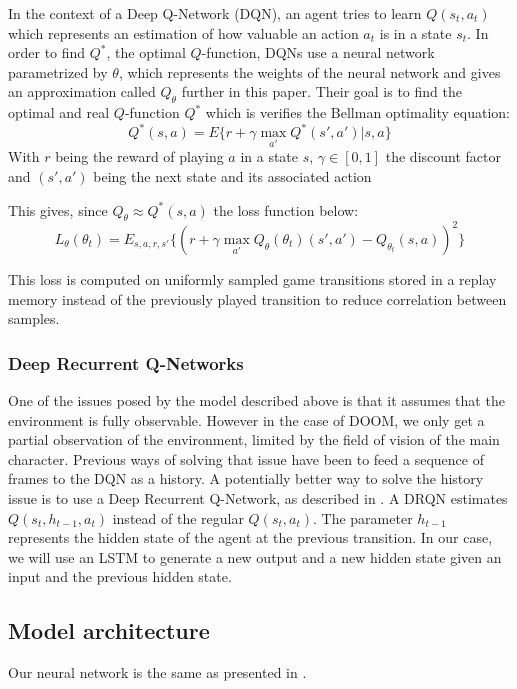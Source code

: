 \documentclass[letterpaper]{article}
\begin{document}
In the context of a Deep Q-Network (DQN), an agent tries to learn 
$Q(s_t,a_t)$ which represents an
estimation of how valuable an action $a_t$ is in a state $s_t$. In order to
find $Q^*$, the optimal $Q$-function, DQNs use a neural network
parametrized by $\theta$, which represents the weights of the neural network
and gives an approximation called $Q_\theta$ further in this paper. Their goal
is to find the optimal and real $Q$-function $Q^*$ which is verifies the Bellman
optimality equation:
$$ Q^*(s,a) = E\{r + \gamma \max_{a'}Q^*(s',a')|s,a\} $$
With $r$ being the reward of playing $a$ in a state $s$, $\gamma\in [0,1]$ the
discount factor and $(s',a')$ being the next state and its associated action

This gives, since $Q_{\theta} \approx Q^*(s,a)$ the loss function below:
$$ L_\theta(\theta_t) = E_{s,a,r,s'}\{(r +\gamma \max_{a'}Q_\theta(\theta_t)(s' , a' )-Q_{\theta_t}(s,a))^2\}$$

This loss is computed on uniformly sampled game transitions stored in a 
replay memory instead of the previously played transition to reduce correlation
between samples.


\subsubsection{Deep Recurrent Q-Networks}
One of the issues posed by the model described above is that it assumes that the 
environment is fully observable. However in the case of DOOM, we only get a 
partial
observation of the environment, limited by the field of vision of the main
character. Previous ways of solving that issue have been to feed a sequence of 
frames to the DQN as a history.
A potentially better way to solve the history issue is to use a Deep Recurrent
Q-Network, as described in \citep{Hausknecht2015}. A DRQN
estimates $Q(s_t,h_{t-1},a_t)$ instead of the regular $Q(s_t,a_t)$. The
parameter $h_{t-1}$ represents the hidden state of the agent at the previous 
transition. In our case, we will use an LSTM to generate a new output and a new
hidden state given an input and the previous hidden state.

\subsection{Model architecture}
Our neural network is the same as presented in \citep{Lample2016}.
\end{document}
